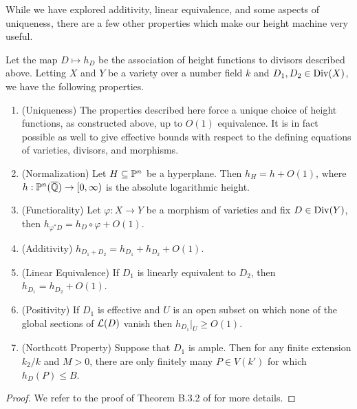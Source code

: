 While we have explored additivity, linear equivalence, and some aspects of uniqueness,
there are a few other properties which make our height machine very useful.

\begin{theorem}
    Let the map $D \mapsto h_D$ be the association of height functions to divisors described above.
    Letting $X$ and $Y$ be a variety over a number field $k$ and $D_1, D_2 \in {\rm Div}(X)$,
    we have the following properties.
    \begin{enumerate}
        \item (Uniqueness)
        The properties described here force a unique choice of height functions, 
        as constructed above, up to $O(1)$ equivalence.
        It is in fact possible as well to give effective bounds with respect to the defining equations of varieties, divisors, and morphisms.

        \item (Normalization)
        Let $H \subseteq \mathbb{P}^n$ be a hyperplane.
        Then $h_H = h + O(1)$,
        where $h : \mathbb{P}^n(\overline {\mathbb{Q}}) \to [0, \infty)$ is the absolute logarithmic height.

        \item (Functiorality)
        Let $\varphi : X \to Y$ be a morphism of varieties and fix $D \in {\rm Div}(Y)$,
       then $h_{\varphi^* D} = h_D \circ \varphi + O(1)$.

       \item (Additivity)
       $h_{D_1 + D_2} = h_{D_1} + h_{D_2} + O(1)$.

       \item (Linear Equivalence)
       If $D_1$ is linearly equivalent to $D_2$,
       then $h_{D_1} = h_{D_2} + O(1)$.

       \item (Positivity)
       If $D_1$ is effective and $U$ is an open subset on which none of the global sections of $\mathcal{L}(D)$ vanish
       then $h_{D_1}|_U \geq O(1)$.

       \item (Northcott Property)
       Suppose that $D_1$ is ample.
       Then for any finite extension $k_2/k$ and $M > 0$,
       there are only finitely many $P \in V(k')$ for which $h_D(P) \leq B$.
    \end{enumerate}
\end{theorem}

\begin{proof}
    We refer to the proof of Theorem B.3.2 of \cite{Silverman_Hindry_2013} for more details.
\end{proof}